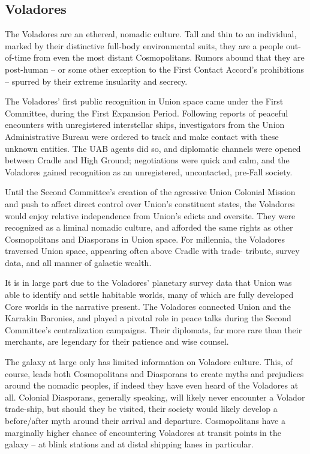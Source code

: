 \subsection{Voladores}

The Voladores are an ethereal, nomadic culture. Tall and thin to an individual, marked by their
distinctive full-body environmental suits, they are a people out-of-time from even the most
distant Cosmopolitans. Rumors abound that they are post-human -- or some other exception to
the First Contact Accord's prohibitions -- spurred by their extreme insularity and secrecy.

The Voladores' first public recognition in Union space came under the First Committee, during
the First Expansion Period. Following reports of peaceful encounters with unregistered
interstellar ships, investigators from the Union Administrative Bureau were ordered to track and
make contact with these unknown entities. The UAB agents did so, and diplomatic channels
were opened between Cradle and High Ground; negotiations were quick and calm, and the
Voladores gained recognition as an unregistered, uncontacted, pre-Fall society.

Until the Second Committee's creation of the agressive Union Colonial Mission and push to
affect direct control over Union's constituent states, the Voladores would enjoy relative
independence from Union's edicts and oversite. They were recognized as a liminal nomadic
culture, and afforded the same rights as other Cosmopolitans and Diasporans in Union space.
For millennia, the Voladores traversed Union space, appearing often above Cradle with trade-
tribute, survey data, and all manner of galactic wealth.

It is in large part due to the Voladores' planetary survey data that Union was able to identify and
settle habitable worlds, many of which are fully developed Core worlds in the narrative present.
The Voladores connected Union and the Karrakin Baronies, and played a pivotal role in peace
talks during the Second Committee's centralization campaigns. Their diplomats, far more rare
than their merchants, are legendary for their patience and wise counsel.

The galaxy at large only has limited information on Voladore culture. This, of course, leads both
Cosmopolitans and Diasporans to create myths and prejudices around the nomadic peoples, if
indeed they have even heard of the Voladores at all. Colonial Diasporans, generally speaking, will
likely never encounter a Volador trade-ship, but should they be visited, their society would likely
develop a before/after myth around their arrival and departure. Cosmopolitans have a marginally
higher chance of encountering Voladores at transit points in the galaxy -- at blink stations and at
distal shipping lanes in particular.

